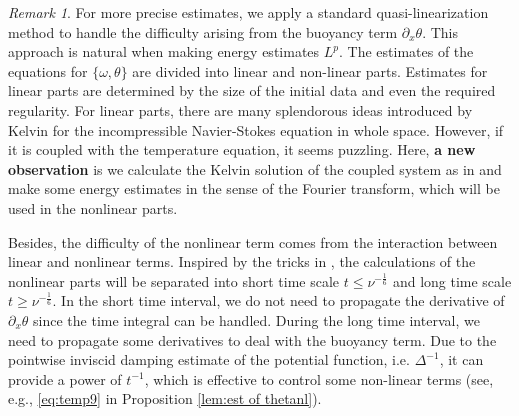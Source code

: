 \documentclass[reqno, 12pt]{amsart} %
\theoremstyle{plain} %
\theoremstyle{definition}
\theoremstyle{remark}
\newtheorem{Rem}[Thm]{Remark}
\numberwithin{equation}{section} %
\begin{document}
	
	
	
	
	\begin{Rem}
		For more precise estimates, we apply a standard quasi-linearization method to handle the difficulty arising from the buoyancy term $\partial_{x}\theta$. This approach is natural when making energy estimates $L^{p}$. The estimates of the equations for $\{\omega, \theta\}$ are divided into linear and non-linear parts. Estimates for linear parts are determined by the size of the initial data and even the required regularity. For linear parts, there are many splendorous ideas introduced by Kelvin\cite{K1887} for the incompressible Navier-Stokes equation in whole space. However, if it is coupled with the temperature equation, it seems puzzling. Here, {\bf a new observation} is we calculate the Kelvin solution of the coupled system as in \cite{DWZ2021} and make some energy estimates in the sense of the Fourier transform, which will be used in the nonlinear parts.
        
        
        
        
        
        
        Besides, the difficulty of the nonlinear term comes from the interaction between linear and nonlinear terms.
	 Inspired by the tricks in \cite{WZ2023}, the calculations of the nonlinear parts will be separated into short time scale $t\leq \nu^{-\frac16}$ and long time scale $t\geq \nu^{-\frac16}$. In the short time interval, we do not need to propagate the derivative of $\partial_{x}\theta$ since the time integral can be handled. During the long time interval, we need to propagate some derivatives to deal with the buoyancy term. Due to the pointwise inviscid damping estimate of the potential function, i.e. $\Delta^{-1}$, it can provide a power of $t^{-1}$, which  is effective to control  some  non-linear terms (see, e.g., \eqref{eq:temp9} in Proposition \ref{lem:est of thetanl}). 
     \end{Rem}
     
     
	
\end{document}
